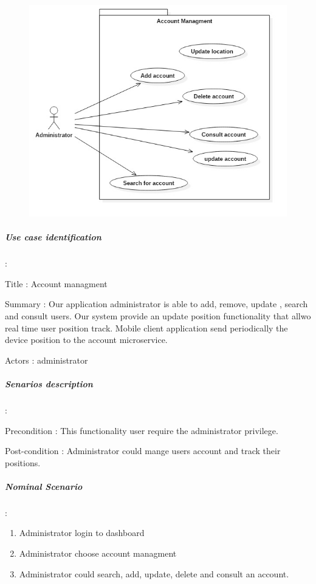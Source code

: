  \begin{figure}[H]
	\centering
	\includegraphics[height=0.3\textheight]{fig01/userMangment}
	\label{fig:FilialesEtClients}
\end{figure}

\subparagraph{Use case identification} :
\label{sec:sec01} 

Title : Account managment

Summary : Our application administrator is able to add, remove, update , search and consult users. Our system provide
an update position functionality that allwo real time user position track. Mobile client application send periodically 
the device position to the account microservice.

Actors : administrator

\subparagraph{Senarios description} :
\label{sec:sec01}

Precondition : This functionality user require the administrator privilege.

Post-condition : Administrator could mange users account and track their positions.

\subparagraph{Nominal Scenario} :
\label{sec:sec01}

 \begin{enumerate}
   \item Administrator login to dashboard
   \item Administrator choose account managment
   \item Administrator could search, add, update, delete and consult an account.  
 \end{enumerate}

